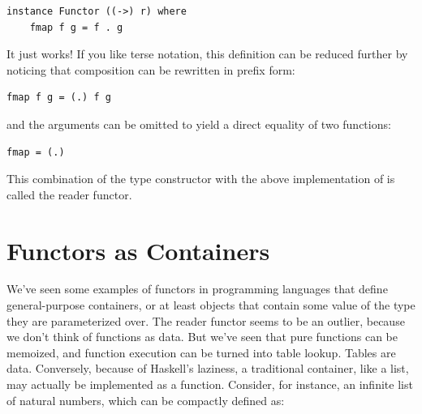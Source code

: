 \begin{Verbatim}[commandchars=\\\{\}]
instance Functor ((->) r) where
    fmap f g = f . g
\end{Verbatim}
It just works! If you like terse notation, this definition can be
reduced further by noticing that composition can be rewritten in prefix
form:

\begin{Verbatim}[commandchars=\\\{\}]
fmap f g = (.) f g
\end{Verbatim}
and the arguments can be omitted to yield a direct equality of two
functions:

\begin{Verbatim}[commandchars=\\\{\}]
fmap = (.)
\end{Verbatim}
This combination of the type constructor 
with the above implementation of  is called the reader
functor.

\section{Functors as Containers}\label{functors-as-containers}

We've seen some examples of functors in programming languages that
define general-purpose containers, or at least objects that contain some
value of the type they are parameterized over. The reader functor seems
to be an outlier, because we don't think of functions as data. But we've
seen that pure functions can be memoized, and function execution can be
turned into table lookup. Tables are data. Conversely, because of
Haskell's laziness, a traditional container, like a list, may actually
be implemented as a function. Consider, for instance, an infinite list
of natural numbers, which can be compactly defined as:

